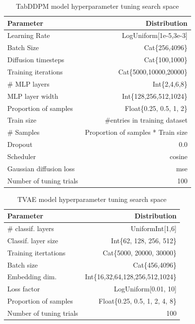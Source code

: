 \begin{table}[h]
	\centering
	\begin{tabular}{lr}
		\toprule
		Parameter               & Distribution                       \\
		\midrule
		Learning Rate           & LogUniform[1e-5,3e-3]              \\
		Batch Size              & Cat\{256,4096\}                    \\
		Diffusion timesteps     & Cat\{100,1000\}                    \\
		Training iterations     & Cat\{5000,10000,20000\}            \\
		\# MLP layers           & Int\{2,4,6,8\}                     \\
		MLP layer width         & Int\{128,256,512,1024\}            \\
		Proportion of samples   & Float\{0.25, 0.5, 1, 2\}           \\
		\midrule
		Train size              & \#entries in training dataset      \\
		\# Samples              & Proportion of samples * Train size \\
		Dropout                 & 0.0                                \\
		Scheduler               & cosine                             \\
		Gaussian diffusion loss & mse                                \\
		\midrule
		Number of tuning trials & 100                                \\
		\bottomrule
	\end{tabular}
	\caption[TabDDPM Hyperparameter Search Space]{TabDDPM model hyperparameter tuning search space}
	\label{tab:diff_tune}
\end{table}



\begin{table}[h]
	\centering
	\begin{tabular}{lr}
		\toprule
		Parameter               & Distribution                     \\
		\midrule
		\# classif. layers      & UniformInt[1,6]                  \\
		Classif. layer size     & Int\{62, 128, 256, 512\}         \\
		Training itertations    & Cat\{5000, 20000, 30000\}        \\
		Batch size              & Cat\{456,4096\}                  \\
		Embedding dim.          & Int\{16,32,64,128,256,512,1024\} \\
		Loss factor             & LogUniform[0.01, 10]             \\
		Proportion of samples   & Float\{0.25, 0.5, 1, 2, 4, 8\}   \\
		\midrule
		Number of tuning trials & 100                              \\
		\bottomrule
	\end{tabular}
	\caption[TVAE Hyperparameter Search Space]{TVAE model hyperparameter tuning search space}
	\label{tab:tvae_tune}

\end{table}

